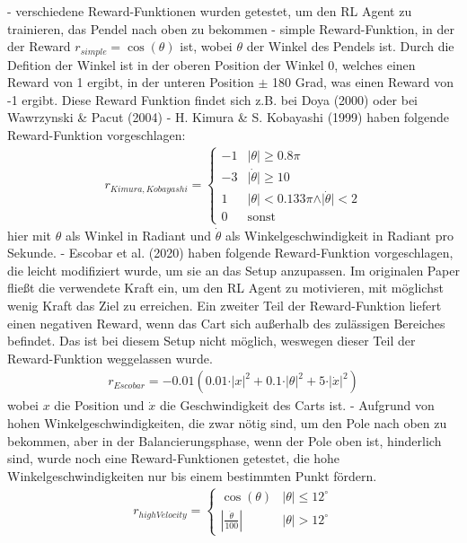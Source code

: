 - verschiedene Reward-Funktionen wurden getestet, um den RL Agent zu trainieren, das Pendel nach oben zu bekommen
- simple Reward-Funktion, in der der Reward $r_{simple}=\cos(\theta)$ ist, wobei $\theta$ der Winkel des Pendels ist. Durch die Defition der Winkel ist in der oberen Position der Winkel 0, welches einen Reward von 1 ergibt, in der unteren Position $\pm$ 180 Grad, was einen Reward von -1 ergibt. Diese Reward Funktion findet sich z.B. bei Doya (2000) oder bei Wawrzynski & Pacut (2004)
- H. Kimura & S. Kobayashi (1999) haben folgende Reward-Funktion vorgeschlagen: \begin{align}
    r_{Kimura,Kobayashi} = \begin{cases}
        -1 & \vert\theta\vert \ge 0.8\pi \\
        -3 & \vert\dot{\theta}\vert \ge 10 \\
        1 & \vert\theta\vert < 0.133\pi \land \vert\dot{\theta}\vert < 2 \\ 
        0 & \text{sonst}
    \end{cases}
\end{align} hier mit $\theta$ als Winkel in Radiant und $\dot{\theta}$ als Winkelgeschwindigkeit in Radiant pro Sekunde.
- Escobar et al. (2020) haben folgende Reward-Funktion vorgeschlagen, die leicht modifiziert wurde, um sie an das Setup anzupassen. Im originalen Paper fließt die verwendete Kraft ein, um den RL Agent zu motivieren, mit möglichst wenig Kraft das Ziel zu erreichen. Ein zweiter Teil der Reward-Funktion liefert einen negativen Reward, wenn das Cart sich außerhalb des zulässigen Bereiches befindet. Das ist bei diesem Setup nicht möglich, weswegen dieser Teil der Reward-Funktion weggelassen wurde. \begin{align}
    r_{Escobar} = -0.01\left(0.01\cdot\vert x\vert^2 + 0.1\cdot\vert\theta\vert^2 + 5\cdot\vert \dot{x}\vert^2\right)
\end{align} wobei $x$ die Position und $\dot{x}$ die Geschwindigkeit des Carts ist. 
- Aufgrund von hohen Winkelgeschwindigkeiten, die zwar nötig sind, um den Pole nach oben zu bekommen, aber in der Balancierungsphase, wenn der Pole oben ist, hinderlich sind, wurde noch eine Reward-Funktionen getestet, die hohe Winkelgeschwindigkeiten nur bis einem bestimmten Punkt fördern. \begin{align}
    r_{highVelocity} = \begin{cases}
        \cos(\theta) & \vert\theta\vert \le 12^\circ \\
        \left|\frac{\dot{\theta}}{100}\right| & \vert\theta\vert > 12^\circ
    \end{cases}
\end{align}
